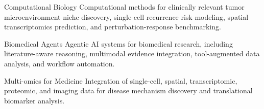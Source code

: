

\begin{cvskills}
  \cvskill
    {Computational Biology}
    {Computational methods for clinically relevant tumor microenvironment niche discovery, single-cell recurrence risk modeling, spatial transcriptomics prediction, and perturbation-response benchmarking.}

  \cvskill
    {Biomedical Agents}
    {Agentic AI systems for biomedical research, including literature-aware reasoning, multimodal evidence integration, tool-augmented data analysis, and workflow automation.}

  \cvskill
    {Multi-omics for Medicine}
    {Integration of single-cell, spatial, transcriptomic, proteomic, and imaging data for disease mechanism discovery and translational biomarker analysis.}
\end{cvskills}
